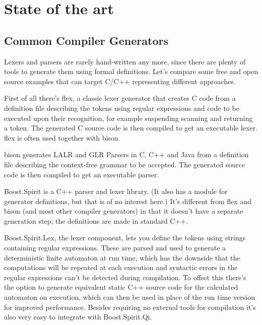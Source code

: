 
\chapter{State of the art}
        
        
	\section{Common Compiler Generators}
    	
		Lexers and parsers are rarely hand-written any more, since there are plenty of tools to generate them using formal definitions. Let's compare some free and open source examples that can target C/C++ representing different approaches.
		
		First of all there's flex\cite{flex}, a classic lexer generator that creates C code from a definition file describing the tokens using regular expressions and code to be executed upon their recognition, for example suspending scanning and returning a token. The generated C source code is then compiled to get an executable lexer. flex is often used together with bison.
		
		bison\cite{bison} generates LALR and GLR Parsers in C, C++ and Java from a definition file describing the context-free grammar to be accepted. The generated source code is then compiled to get an executable parser.
		
		Boost.Spirit\cite{spirit} is a C++ parser and lexer library. (It also has a module for generator definitions, but that is of no interest here.) It's different from flex and bison (and most other compiler generators) in that it doesn't have a separate generation step; the definitions are made in standard C++.
		
		Boost.Spirit.Lex, the lexer component, lets you define the tokens using strings containing regular expressions. These are parsed and used to generate a deterministic finite automaton at run time, which has the downside that the computations will be repeated at each execution and syntactic errors in the regular expressions can't be detected during compilation. To offset this there's the option to generate equivalent static C++ source code for the calculated automaton on execution, which can then be used in place of the run time version for improved performance. Besides requiring no external tools for compilation it's also very easy to integrate with Boost.Spirit.Qi.
		
